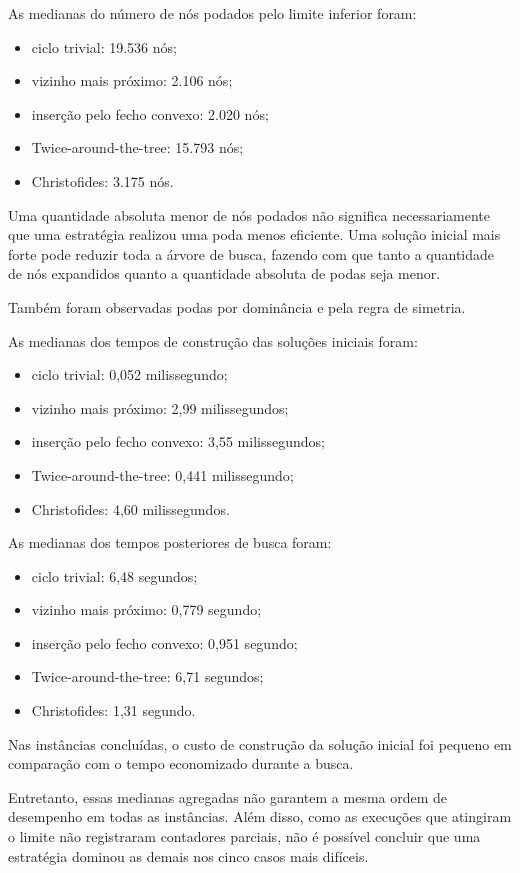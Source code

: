 \documentclass[12pt]{article}
\begin{document}
As medianas do número de nós podados pelo limite inferior foram:
\begin{itemize}
  \item ciclo trivial: 19.536 nós;
  \item vizinho mais próximo: 2.106 nós;
  \item inserção pelo fecho convexo: 2.020 nós;
  \item Twice-around-the-tree: 15.793 nós;
  \item Christofides: 3.175 nós.
\end{itemize}

Uma quantidade absoluta menor de nós podados não significa necessariamente que uma estratégia realizou uma poda menos eficiente. Uma solução inicial mais forte pode reduzir toda a árvore de busca, fazendo com que tanto a quantidade de nós expandidos quanto a quantidade absoluta de podas seja menor.

Também foram observadas podas por dominância e pela regra de simetria.

As medianas dos tempos de construção das soluções iniciais foram:
\begin{itemize}
  \item ciclo trivial: 0,052 milissegundo;
  \item vizinho mais próximo: 2,99 milissegundos;
  \item inserção pelo fecho convexo: 3,55 milissegundos;
  \item Twice-around-the-tree: 0,441 milissegundo;
  \item Christofides: 4,60 milissegundos.
\end{itemize}

As medianas dos tempos posteriores de busca foram:
\begin{itemize}
  \item ciclo trivial: 6,48 segundos;
  \item vizinho mais próximo: 0,779 segundo;
  \item inserção pelo fecho convexo: 0,951 segundo;
  \item Twice-around-the-tree: 6,71 segundos;
  \item Christofides: 1,31 segundo.
\end{itemize}

Nas instâncias concluídas, o custo de construção da solução inicial foi pequeno em comparação com o tempo economizado durante a busca.

Entretanto, essas medianas agregadas não garantem a mesma ordem de desempenho em todas as instâncias. Além disso, como as execuções que atingiram o limite não registraram contadores parciais, não é possível concluir que uma estratégia dominou as demais nos cinco casos mais difíceis.
\end{document}
